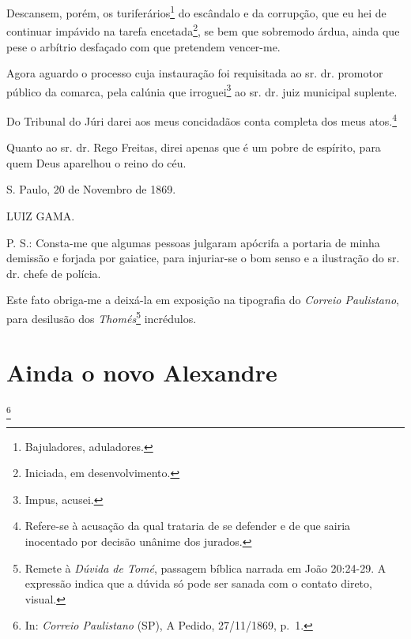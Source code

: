 Descansem, porém, os turiferários\footnote{Bajuladores, aduladores.}
do escândalo e da corrupção, que eu hei de continuar impávido na tarefa
encetada\footnote{Iniciada, em desenvolvimento.}, se bem que sobremodo
árdua, ainda que pese o arbítrio desfaçado com que pretendem vencer-me.

Agora aguardo o processo cuja instauração foi requisitada ao sr. dr.
promotor público da comarca, pela calúnia que irroguei\footnote{Impus,
  acusei.} ao sr. dr. juiz municipal suplente.

Do Tribunal do Júri darei aos meus concidadãos conta completa dos meus
atos.\footnote{Refere-se à acusação da qual trataria de se defender e
  de que sairia inocentado por decisão unânime dos jurados.}

Quanto ao sr. dr. Rego Freitas, direi apenas que é um pobre de espírito,
para quem Deus aparelhou o reino do céu.

S. Paulo, 20 de Novembro de 1869.

LUIZ GAMA.

P. S.: Consta-me que algumas pessoas julgaram apócrifa a portaria de
minha demissão e forjada por gaiatice, para injuriar-se o bom senso e a
ilustração do sr. dr. chefe de polícia.

Este fato obriga-me a deixá-la em exposição na tipografia do
\emph{Correio Paulistano}, para desilusão dos \emph{Thomés}\footnote{
  Remete à \emph{Dúvida de Tomé}, passagem bíblica narrada em João
  20:24-29. A expressão indica que a dúvida só pode ser sanada com o
  contato direto, visual.} incrédulos.

\chapter{Ainda o novo Alexandre}\footnote{In: \emph{Correio Paulistano}
  (SP), A Pedido, 27/11/1869, p.~1.}

